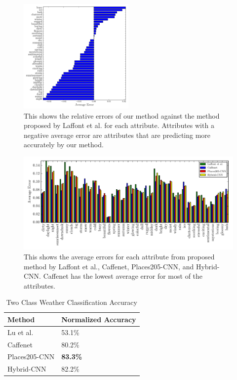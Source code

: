 \documentclass{article}
\begin{document}
\begin{figure}[t]
	\centering
		\includegraphics[width=0.5\textwidth]{figs/rel_err_cmr.pdf}
		\caption{This shows the relative errors of our method against the method 
						 proposed by Laffont et al. for each attribute.  Attributes with a 
						 negative average error are attributes that are predicting more 
						 accurately by our method.}
		\label{fig:relerr}
\end{figure}

\begin{figure}[t]
	\centering
		\includegraphics[width=1.0\textwidth]{figs/avg_err_compare_cmr.pdf}
		\caption{This shows the average errors for each attribute from proposed method
						 by Laffont et al., Caffenet, Places205-CNN, and Hybrid-CNN.  Caffenet
						 has the lowest average error for most of the attributes.}
		\label{fig:compare}
\end{figure}

\begin{table}[t]
	\centering
	\begin{tabular}{ | l | l | }
		\hline
			Method & Normalized Accuracy \\ \hline
			Lu et al. & 53.1\% \\ \hline
			Caffenet & 80.2\% \\ \hline
			Places205-CNN & \textbf{83.3\%} \\ \hline
			Hybrid-CNN & 82.2\% \\ 
		\hline
	\end{tabular}
	\caption{Two Class Weather Classification Accuracy}
	\label{tbl:twoclass}
\end{table}
\end{document}
